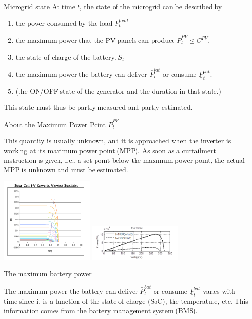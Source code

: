 \begin{frame}{Microgrid state}
At time $t$, the state of the microgrid can be described by
\begin{enumerate}
 \item the power consumed by the load $P^{load}_t$ %
 \item the maximum power that the PV panels can produce $\bar{P}^{PV}_t \leq C^{PV}$. 
 \item the state of charge of the battery, $S_t$
 \item the maximum power the battery can deliver $\bar{P}^{bat}_t$ or consume $\underline{P}^{bat}_t$. 
 \item (the ON/OFF state of the generator and the duration in that state.)
\end{enumerate}
This state must thus be partly measured and partly estimated.
\end{frame}

\begin{frame}{About the Maximum Power Point $\bar{P}^{PV}_t$}

    This quantity is usually unknown, and it is approached when the inverter is working at its maximum power point (MPP). As soon as a curtailment instruction is given, i.e., a set point below the maximum power point, the actual MPP is unknown and must be estimated. 

    \begin{center}    
    \includegraphics[width=0.35\textwidth]{images/Solar-Cell-IV-curve-with-MPP.png}%
    \includegraphics[width=0.35\textwidth]{images/Power-voltage_(P_-V)_curve.png}    
    \end{center}


\end{frame}
\begin{frame}{The maximum battery power}

The maximum power the battery can deliver $\bar{P}^{bat}_t$ or consume $\underline{P}^{bat}_t$ varies with time since it is a function of the state of charge (SoC), the temperature, etc. This information comes from the battery management system (BMS).
    
\end{frame}

